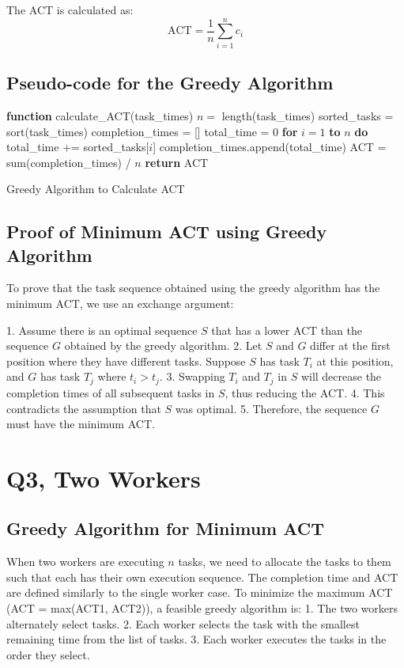 \documentclass{article}
\begin{document}
The ACT is calculated as:
\[
\text{ACT} = \frac{1}{n} \sum_{i=1}^{n} c_i
\]

\subsection*{Pseudo-code for the Greedy Algorithm}
\begin{algorithm}
\begin{algorithmic}
\State \textbf{function} calculate\_ACT(task\_times)
\State \quad $n = $ length(task\_times)
\State \quad sorted\_tasks = sort(task\_times)
\State \quad completion\_times = []
\State \quad total\_time = 0
\State \quad \textbf{for} $i = 1$ \textbf{to} $n$ \textbf{do}
\State \quad \quad total\_time += sorted\_tasks[$i$]
\State \quad \quad completion\_times.append(total\_time)
\State \quad ACT = sum(completion\_times) / $n$
\State \quad \textbf{return} ACT
\end{algorithmic}
\caption{Greedy Algorithm to Calculate ACT}
\end{algorithm}

\subsection*{Proof of Minimum ACT using Greedy Algorithm}
To prove that the task sequence obtained using the greedy algorithm has the minimum ACT, we use an exchange argument:

1. Assume there is an optimal sequence \( S \) that has a lower ACT than the sequence \( G \) obtained by the greedy algorithm.
2. Let \( S \) and \( G \) differ at the first position where they have different tasks. Suppose \( S \) has task \( T_i \) at this position, and \( G \) has task \( T_j \) where \( t_i > t_j \).
3. Swapping \( T_i \) and \( T_j \) in \( S \) will decrease the completion times of all subsequent tasks in \( S \), thus reducing the ACT.
4. This contradicts the assumption that \( S \) was optimal.
5. Therefore, the sequence \( G \) must have the minimum ACT.

\section{Q3, Two Workers}

\subsection*{Greedy Algorithm for Minimum ACT}
When two workers are executing $n$ tasks, we need to allocate the tasks to them such that each has their own execution sequence. The completion time and ACT are defined similarly to the single worker case. To minimize the maximum ACT (ACT = max(ACT1, ACT2)), a feasible greedy algorithm is:
1. The two workers alternately select tasks.
2. Each worker selects the task with the smallest remaining time from the list of tasks.
3. Each worker executes the tasks in the order they select.
\end{document}
